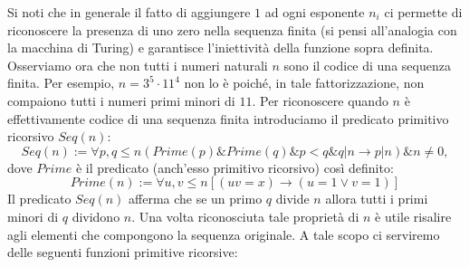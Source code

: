 Si noti che in generale il fatto di aggiungere $1$ ad ogni esponente $n_i$ ci permette di riconoscere la presenza di uno zero nella sequenza finita (si pensi all'analogia con la macchina di Turing) e garantisce l'iniettivit\`a della funzione sopra definita. Osserviamo ora che non tutti i numeri naturali $n$ sono il codice di una sequenza finita. Per esempio, $n = 3^5\cdot 11^4$ non lo \`e poich\'e, in tale fattorizzazione, non compaiono tutti i numeri primi minori di $11$. Per riconoscere quando $n$ \`e effettivamente codice di una sequenza finita introduciamo il predicato primitivo ricorsivo $Seq(n)$:
$$
Seq(n) := \forall p,q \leq n (Prime(p) \& Prime(q) \& p < q \& q|n \rightarrow p|n) \& n\ne 0,
$$
 dove  $Prime$ \`e il predicato (anch'esso primitivo ricorsivo) cos{\`{i}} definito:
$$
Prime(n) := \forall u,v \leq n[ (uv = x) \rightarrow (u=1 \vee v=1) ]
$$
 Il predicato $Seq(n)$ afferma che se un primo $q$ divide $n$ allora tutti i primi minori di $q$ dividono $n$.
 Una volta riconosciuta tale propriet\`a di $n$ \`e utile risalire agli elementi che compongono la sequenza originale. A tale scopo ci serviremo delle seguenti funzioni primitive ricorsive:
